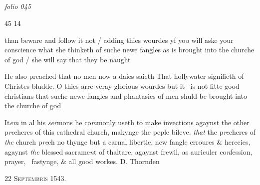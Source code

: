 \documentclass[12pt, a4paper]{book}
\begin{document}
\dotfill
						\newpage {} \subsection*{}

\textit{folio 045}


\begin{flushright}{\color{Mahogany}45} 14\end{flushright}

				\marginpar[\vspace{0.5cm}{\textcolor{Gray}{n}}]{}
			
		\ifthenelse{\isodd{\thepage}}
		{\reversemarginpar}
		{\normalmarginpar}
		than beware and follow it not / adding thies wourdes
 yf yo\textit{u} will aske your conscience what she thinketh
 of suche newe fangles as is brought into the
 churche of god / she will say that they be naught
	
				\marginpar[\vspace{0.5cm}{\textcolor{Gray}{seditious n}}]{}
			
		
				\marginpar[\vspace{0.5cm}{\textcolor{Gray}{n}}]{}
			
		
		\ifthenelse{\isodd{\thepage}}
		{\reversemarginpar}
		{\normalmarginpar}
		He also preached that no men now a daies saieth
 That hollywater signifieth of Christes bludde.
 O thies arre veray glorious wourdes but it 
 is not fitte good christians that suche newe
 fangles and phantasies of men shuld be brought
 into the churche of god
 
		\ifthenelse{\isodd{\thepage}}
		{\reversemarginpar}
		{\normalmarginpar}
		It\textit{em} in al his \textit{ser}mons he co\textit{m}monly useth to make invections agaynst
 the other p\textit{re}cheres of this cathedral church, makynge the peple bileve.
 	\textit{that} the p\textit{re}cheres of \textit{the} church p\textit{re}ch no thynge but a carnal libertie, new fangle
 erroures \& herecies, agaynst \textit{the} blessed sacrame\textit{n}t of thaltare, agaynst frewil,
 as auriculer co\textit{n}fession, prayer, 
 fastynge, \& all good workes.
 	D. Thornden
			
 

            
            
               
				\begin{center} \begin{large} {\scshape 
                  22 Septembris 1543.} \end{large} \end{center}
			
\end{document}

